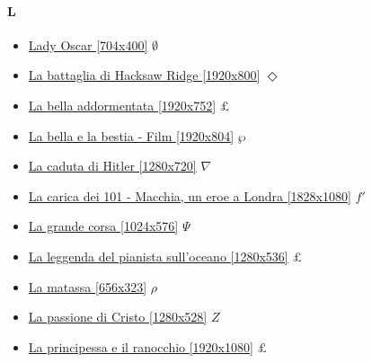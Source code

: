 	\paragraph{L} \hypertarget{FIL}{}
		\begin{itemize}
			
			\item \href{https://mega.nz/#!xGJXBSxL!GSUdO1dLN6ySqSBogdGds_TDWyBiN5F10Xi8jvHepr8} {Lady Oscar [704x400]}  $\emptyset$ \\ 
			\item \href{https://mega.nz/#!TERWASaI!0twQbL_K_BV7fEjiJWTDUH_vmORSFu054niiVIKlBSk} {La battaglia di Hacksaw Ridge [1920x800]}  $\Diamond$ \\ 
			\item \href{https://mega.nz/#!mmY1RKjI!i07esjj4mvcdJNnmlcMpDYGkbRA5OK7FlQ8gETnuFCk} {La bella addormentata [1920x752]}  $\pounds$ \\ 
			\item \href{https://mega.nz/#!2TJRXbiR!gLH1quIYnUne_412x_aX_m9lAu7NWmED88X5sykETHo} {La bella e la bestia - Film [1920x804]}  $\wp$ \\ 
			\item \href{https://mega.nz/#!aXIkCRSB!vyqAEE1yVAMi5_FGuI_0rXy0lmEnMmXc688v89ZUZBo} {La caduta di Hitler [1280x720]}  $\nabla$ \\ 
			\item \href{https://mega.nz/#!6jREGIYJ!dUR5RJpnKmQgQmqlbJ0sZnxkHMseYk31wPLJJiQoO7M} {La carica dei 101 - Macchia, un eroe a Londra [1828x1080]}  $f'$ \\ 
			\item \href{https://mega.nz/#!JDJRCBYC!pvJ_8vetWt9BmfkfuqwA6w_vA5TsDs0LPPUG9jRRzLk} {La grande corsa [1024x576]}  $\varPsi$ \\ 	
			\item \href{https://mega.nz/#!qj5ijITJ!dPGV9ntsbE1jhFTO7-QXGQ9p_eKJxP_fZsRcfJFF2ZY} {La leggenda del pianista sull'oceano [1280x536]}  $\pounds$ \\ 	
			\item \href{https://mega.nz/#!RNgXiDYI!Zrl4mStXHLoY42vv4_bnDYWQYjEuXk66HwLdGw-2utY} {La matassa [656x323]}  $\rho$ \\ 
			\item \href{https://mega.nz/#!VQZXQSDZ!zcaQtwP7Z3lv4-cie2bxxOEzkPbt-bli_e5yF50ZuLM} {La passione di Cristo [1280x528]}  $Z$ \\ 	
			\item \href{https://mega.nz/#!fiJRAT7K!dWYQgui85xGxASbb7ZiDYLsnXT62inu7PWiOlGr6rgM} {La principessa e il ranocchio [1920x1080]}  $\pounds$ \\ 	

\end{itemize}
